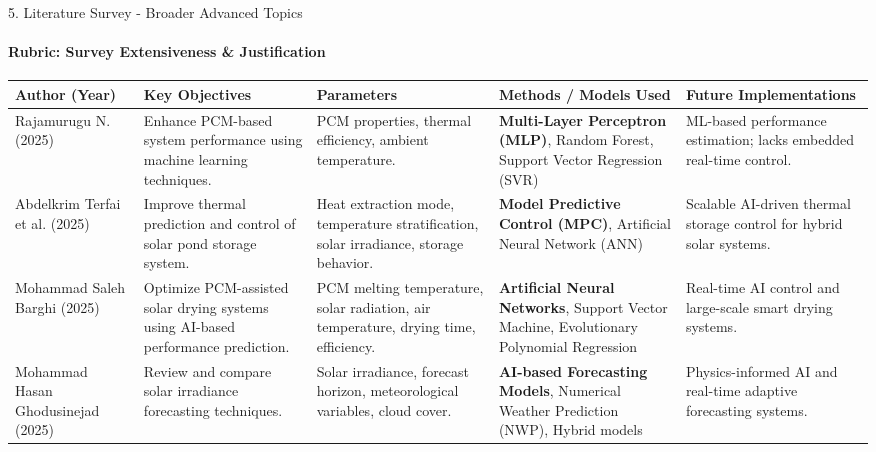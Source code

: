 \documentclass[aspectratio=169, 11pt]{beamer}
\begin{document}
\begin{frame}{5. Literature Survey - Broader Advanced Topics}
\framesubtitle{Rubric: Survey Extensiveness \& Justification}
\tiny
\renewcommand{\arraystretch}{1.5}
\begin{table}
\centering
\begin{tabular}{|p{1.6cm}|p{3.0cm}|p{2.8cm}|p{3.0cm}|p{3.0cm}|}
\hline
\textbf{Author (Year)} &
\textbf{Key Objectives} &
\textbf{Parameters} &
\textbf{Methods / Models Used} &
\textbf{Future Implementations} \\
\hline
Rajamurugu N. (2025) \cite{Rajamurugu2025PCMML} &
Enhance PCM-based system performance using machine learning techniques. &
PCM properties, thermal efficiency, ambient temperature. &
\textbf{Multi-Layer Perceptron (MLP)}, Random Forest, Support Vector Regression (SVR) &
ML-based performance estimation; lacks embedded real-time control. \\
\hline 

Abdelkrim Terfai et al. (2025) \cite{Terfai2025SolarPond_ANN_MPC} &
Improve thermal prediction and control of solar pond storage system. &
Heat extraction mode, temperature stratification, solar irradiance, storage behavior. &
\textbf{Model Predictive Control (MPC)}, Artificial Neural Network (ANN) &
Scalable AI-driven thermal storage control for hybrid solar systems. \\
\hline

Mohammad Saleh Barghi (2025) \cite{Barghi2026SolarDryingPCM} &
Optimize PCM-assisted solar drying systems using AI-based performance prediction. &
PCM melting temperature, solar radiation, air temperature, drying time, efficiency. &
\textbf{Artificial Neural Networks}, Support Vector Machine, Evolutionary Polynomial Regression &
Real-time AI control and large-scale smart drying systems. \\
\hline

Mohammad Hasan Ghodusinejad (2025) \cite{Ghodusinejad2026SolarForecast} &
Review and compare solar irradiance forecasting techniques. &
Solar irradiance, forecast horizon, meteorological variables, cloud cover. &
\textbf{AI-based Forecasting Models}, Numerical Weather Prediction (NWP), Hybrid models &
Physics-informed AI and real-time adaptive forecasting systems. \\
\hline 

\end{tabular}
\end{table}
\end{frame}
\end{document}
